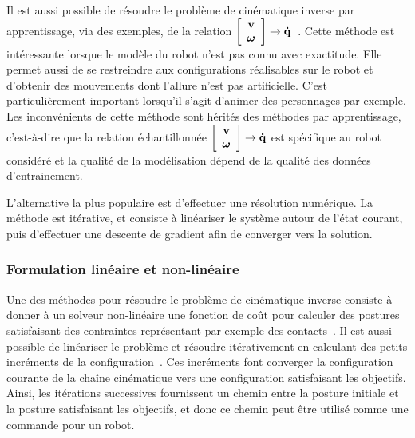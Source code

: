 Il est aussi possible de résoudre le problème de cinématique inverse 
par apprentissage, via des exemples, de la relation $\left[ \begin{array}{cc}
  {\mathbf{v}}\\
  \boldsymbol\omega
\end{array}
\right]  \rightarrow {\mathbf{\dot{q}}}$~\cite{dsouza01}. 
Cette méthode est intéressante
lorsque le modèle du robot n'est pas connu avec exactitude. Elle
permet aussi de se restreindre aux configurations réalisables sur le 
robot et d'obtenir des mouvements dont l'allure n'est pas 
artificielle. C'est particulièrement important lorsqu'il s'agit
d'animer des personnages par exemple. Les inconvénients de cette méthode sont hérités des méthodes par apprentissage,
c'est-à-dire que la relation échantillonnée $ \left[ \begin{array}{cc}
  {\mathbf{v}}\\
  \boldsymbol\omega
\end{array}
\right] \rightarrow {\mathbf{\dot{q}}}$
est spécifique au robot considéré et la qualité de la modélisation dépend de la qualité
des données d'entrainement.

L'alternative la plus populaire est d'effectuer une résolution numérique.
La méthode est itérative, et consiste à linéariser le système
autour de l'état courant, puis d'effectuer une descente de gradient
afin de converger vers la solution.

\subsubsection{Formulation linéaire et non-linéaire}
Une des méthodes pour résoudre le problème de cinématique inverse consiste à donner
à un solveur non-linéaire une fonction de coût pour 
calculer des postures satisfaisant 
des contraintes représentant par exemple des contacts~\cite{escande06}.
Il est aussi possible de linéariser le problème et résoudre itérativement
en calculant des petits incréments de la configuration~\cite{nakamura90}.
Ces incréments font converger la configuration courante
de la chaîne cinématique vers une configuration satisfaisant les
objectifs. Ainsi, les itérations successives fournissent un chemin
entre la posture initiale et la posture satisfaisant les objectifs, et donc
ce chemin peut \^etre utilisé comme une commande pour un robot.

